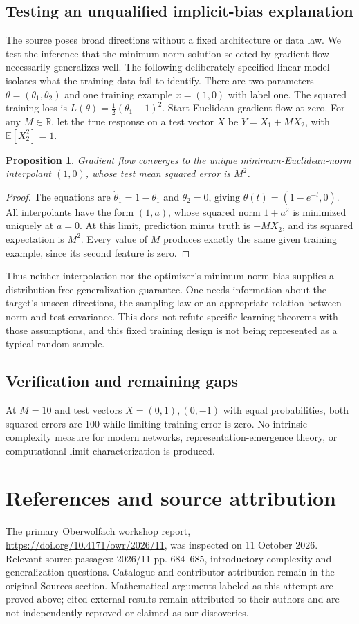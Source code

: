 \documentclass[11pt]{article}
\newtheorem{proposition}{Proposition}
\begin{document}
\subsection{Testing an unqualified implicit-bias explanation}
The source poses broad directions without a fixed architecture or data law. We test the inference that the minimum-norm solution selected by gradient flow necessarily generalizes well. The following deliberately specified linear model isolates what the training data fail to identify.
There are two parameters $\theta=(\theta_1,\theta_2)$ and one training example $x=(1,0)$ with label one. The squared training loss is $L(\theta)=\tfrac12(\theta_1-1)^2$. Start Euclidean gradient flow at zero. For any $M\in\mathbb R$, let the true response on a test vector $X$ be $Y=X_1+MX_2$, with $\mathbb E[X_2^2]=1$.
\begin{proposition}
Gradient flow converges to the unique minimum-Euclidean-norm interpolant $(1,0)$, whose test mean squared error is $M^2$.
\end{proposition}
\begin{proof}
The equations are $\dot\theta_1=1-\theta_1$ and $\dot\theta_2=0$, giving $\theta(t)=(1-e^{-t},0)$. All interpolants have the form $(1,a)$, whose squared norm $1+a^2$ is minimized uniquely at $a=0$. At this limit, prediction minus truth is $-MX_2$, and its squared expectation is $M^2$. Every value of $M$ produces exactly the same given training example, since its second feature is zero.
\end{proof}
Thus neither interpolation nor the optimizer's minimum-norm bias supplies a distribution-free generalization guarantee. One needs information about the target's unseen directions, the sampling law or an appropriate relation between norm and test covariance. This does not refute specific learning theorems with those assumptions, and this fixed training design is not being represented as a typical random sample.
\subsection{Verification and remaining gaps}
At $M=10$ and test vectors $X=(0,1),(0,-1)$ with equal probabilities, both squared errors are 100 while limiting training error is zero. No intrinsic complexity measure for modern networks, representation-emergence theory, or computational-limit characterization is produced.

\section{References and source attribution}
The primary Oberwolfach workshop report, \url{https://doi.org/10.4171/owr/2026/11}, was inspected on 11 October 2026. Relevant source passages: 2026/11 pp. 684--685, introductory complexity and generalization questions. Catalogue and contributor attribution remain in the original Sources section. Mathematical arguments labeled as this attempt are proved above; cited external results remain attributed to their authors and are not independently reproved or claimed as our discoveries.
\end{document}
